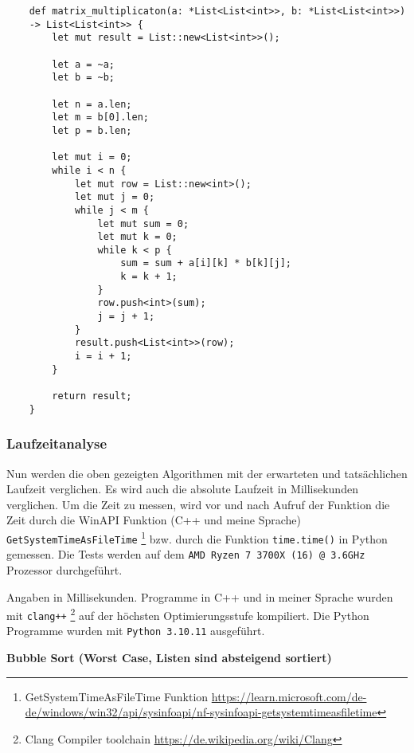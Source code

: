         \begin{lstlisting}
    def matrix_multiplicaton(a: *List<List<int>>, b: *List<List<int>>) 
    -> List<List<int>> {
        let mut result = List::new<List<int>>();
    
        let a = ~a;
        let b = ~b;
    
        let n = a.len;
        let m = b[0].len;
        let p = b.len;
    
        let mut i = 0;
        while i < n {
            let mut row = List::new<int>();
            let mut j = 0;
            while j < m {
                let mut sum = 0;
                let mut k = 0;
                while k < p {
                    sum = sum + a[i][k] * b[k][j];
                    k = k + 1;
                }
                row.push<int>(sum);
                j = j + 1;
            }
            result.push<List<int>>(row);
            i = i + 1;
        }
    
        return result;
    } 
        \end{lstlisting}


        \subsubsection{Laufzeitanalyse}
        Nun werden die oben gezeigten Algorithmen mit der erwarteten und 
        tatsächlichen Laufzeit verglichen. Es wird auch die absolute Laufzeit in Millisekunden
        verglichen. 
        Um die Zeit zu messen, wird vor und nach Aufruf der Funktion die Zeit
        durch die WinAPI Funktion (C++ und meine Sprache) \texttt{GetSystemTimeAsFileTime} 
        \footnote{GetSystemTimeAsFileTime Funktion
        \url{https://learn.microsoft.com/de-de/windows/win32/api/sysinfoapi/nf-sysinfoapi-getsystemtimeasfiletime}}
        bzw. durch die Funktion \texttt{time.time()} in Python gemessen.
        Die Tests werden auf dem \texttt{AMD Ryzen 7 3700X (16) @ 3.6GHz} Prozessor durchgeführt.

        Angaben in Millisekunden. Programme in C++ und in meiner Sprache wurden mit 
        \texttt{clang++}
        \footnote{Clang Compiler toolchain \url{https://de.wikipedia.org/wiki/Clang}}
        auf der höchsten Optimierungsstufe kompiliert. 
        Die Python Programme wurden mit \texttt{Python 3.10.11} ausgeführt.
        \newpage

        \begin{center}
            \textbf{Bubble Sort (Worst Case, Listen sind absteigend sortiert)}
        \end{center}

